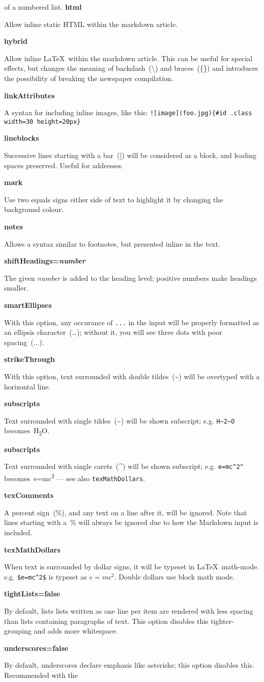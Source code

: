\documentclass[a4paper,DIV=11]{scrartcl}
\newcommand{\deft}[2]{\nopagebreak\noindent\hspace{0.5in}\textbf{#1}\par\noindent{}#2\pagebreak[1]\par}
\begin{document}
\begin{multicols}{2}
{{      of a numbered list.}
    \deft{html}{Allow inline static HTML within the markdown article.}
    \deft{hybrid}{Allow inline \LaTeX\ within the markdown
      article. This can be useful for special effects, but changes the
      meaning of backslash~(\textbackslash) and braces~(\{\}) and
      introduces the possibility of breaking the newspaper compilation.}
    \deft{linkAttributes}{A syntax for including inline images,
      like this: \texttt{![image](foo.jpg)\{\#id .class width=30
        height=20px\}}}
    \deft{lineblocks}{Successive lines starting with a bar~(|) will be
      considered as a block, and leading spaces preserved. Useful for
      addresses.}
    \deft{mark}{Use two equals signs either side of text to
      highlight it by changing the background colour.}
    \deft{notes}{Allows a syntax similar to footnotes, but
      presented inline in the text.}
    \deft{shiftHeadings=\textit{number}}{The given \textit{number} is
      added to the heading level; positive numbers make headings
      smaller.}
    \deft{smartEllipses}{With this option, any occurance of
      \texttt{...} in the input will be properly formatted as an
      ellipsis character~(\dots); without it, you will see three dots
      with poor spacing~(...).}
    \deft{strikeThrough}{With this option, text surrounded with
      double tildes~(\textasciitilde) will be overtyped with a horizontal line.}
    \deft{subscripts}{Text surrounded with single tildes~(\textasciitilde)
      will be shown subscript; e.g. \texttt{H\textasciitilde2\textasciitilde O}
      becomes~H\textsubscript{2}O.}
    \deft{subscripts}{Text surrounded with single carets~(\textasciicircum)
      will be shown subscript; e.g. \texttt{e=mc\textasciicircum2\textasciicircum}
      becomes~e=mc\textsuperscript{2} --- see also \texttt{texMathDollars}.}
    \deft{texComments}{A percent sign~(\%), and any text on a line
      after it, will be ignored. Note that lines starting with a~\%
      will always be ignored due to how the Markdown input is included.}
    \deft{texMathDollars}{When text is surrounded by dollar
      signs, it will be typeset in
      \LaTeX\ math-mode. e.g. \texttt{\$e=mc\textasciicircum2\$} is typeset as
      $e=mc^2$. Double dollars use block math mode.}
    \deft{tightLists=false}{By default, lists lists written as one
      line per item are rendered with less spacing than lists containing paragraphs of
      text. This option disables this tighter-grouping and adds more
      whitespace.}
    \deft{underscores=false}{By default, underscores declare emphasis
      like asterisks; this option disables this. Recommended with the
}}
\end{multicols}
\end{document}
